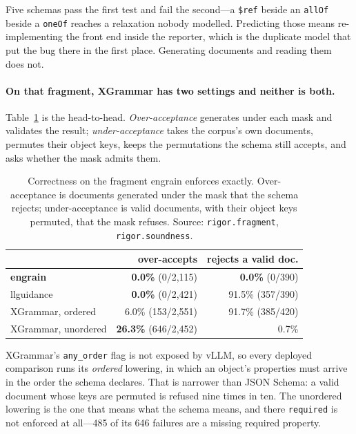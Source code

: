 \documentclass{article}
\begin{document}
Five schemas pass the first test and fail the second---a \verb|$ref| beside an
\texttt{allOf} beside a \texttt{oneOf} reaches a relaxation nobody modelled.
Predicting those means re-implementing the front end inside the reporter, which
is the duplicate model that put the bug there in the first place. Generating
documents and reading them does not.

\paragraph{On that fragment, XGrammar has two settings and neither is both.}
Table~\ref{tab:soundness} is the head-to-head. \emph{Over-acceptance} generates
under each mask and validates the result; \emph{under-acceptance} takes the
corpus's own documents, permutes their object keys, keeps the permutations the
schema still accepts, and asks whether the mask admits them.

\begin{table}[t]
\caption{Correctness on the fragment engrain enforces exactly. Over-acceptance
is documents generated under the mask that the schema rejects; under-acceptance
is valid documents, with their object keys permuted, that the mask refuses.
Source: \texttt{rigor.fragment}, \texttt{rigor.soundness}.}
\label{tab:soundness}
\vskip 0.1in
\begin{center}
\begin{small}
\begin{tabular}{lrr}
\toprule
 & over-accepts & rejects a valid doc. \\
\midrule
\textbf{engrain} & \textbf{0.0\%} (0/2{,}115) & \textbf{0.0\%} (0/390) \\
llguidance & \textbf{0.0\%} (0/2{,}421) & 91.5\% (357/390) \\
XGrammar, ordered & 6.0\% (153/2{,}551) & 91.7\% (385/420) \\
XGrammar, unordered & \textbf{26.3\%} (646/2{,}452) & 0.7\% \\
\bottomrule
\end{tabular}
\end{small}
\end{center}
\vskip -0.1in
\end{table}

XGrammar's \texttt{any\_order} flag is not exposed by vLLM, so every deployed
comparison runs its \emph{ordered} lowering, in which an object's properties
must arrive in the order the schema declares. That is narrower than JSON
Schema: a valid document whose keys are permuted is refused nine times in ten.
The unordered lowering is the one that means what the schema means, and there
\texttt{required} is not enforced at all---485 of its 646 failures are a
missing required property.
\end{document}

